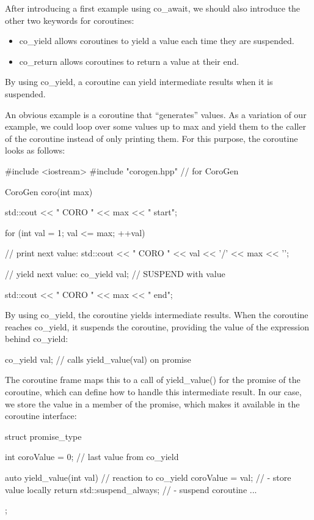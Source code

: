
After introducing a first example using co\_await, we should also introduce the other two keywords for coroutines:

\begin{itemize}
\item 
co\_yield allows coroutines to yield a value each time they are suspended.

\item 
co\_return allows coroutines to return a value at their end.
\end{itemize}


By using co\_yield, a coroutine can yield intermediate results when it is suspended.

An obvious example is a coroutine that “generates” values. As a variation of our example, we could loop over some values up to max and yield them to the caller of the coroutine instead of only printing them. For this purpose, the coroutine looks as follows:


\begin{cpp}
#include <iostream>
#include "corogen.hpp" // for CoroGen

CoroGen coro(int max)
{
	std::cout << "            CORO " << max << " start\n";
	
	for (int val = 1; val <= max; ++val) {
		// print next value:
		std::cout << "              CORO " << val << '/' << max << '\n';
		
		// yield next value:
		co_yield val; // SUSPEND with value
	}
	std::cout << "            CORO " << max << " end\n";
}
\end{cpp}

By using co\_yield, the coroutine yields intermediate results. When the coroutine reaches co\_yield, it suspends the coroutine, providing the value of the expression behind co\_yield:

\begin{cpp}
co_yield val; // calls yield_value(val) on promise
\end{cpp}

The coroutine frame maps this to a call of yield\_value() for the promise of the coroutine, which can define how to handle this intermediate result. In our case, we store the value in a member of the promise, which makes it available in the coroutine interface:

\begin{cpp}
struct promise_type {
	int coroValue = 0; // last value from co_yield
	
	auto yield_value(int val) { // reaction to co_yield
	coroValue = val; // - store value locally
	return std::suspend_always{}; // - suspend coroutine
	}
	...
};
\end{cpp}

